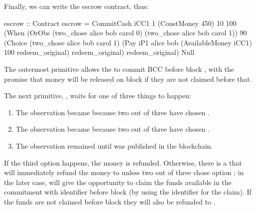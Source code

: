 \documentclass[runningheads]{llncs}
\begin{document}
Finally, we can write the escrow contract, thus:
\begin{haskellcode}
escrow :: Contract
escrow = CommitCash iCC1 1 (ConstMoney 450) 10 100
                    (When (OrObs (two_chose alice bob carol 0)
                                 (two_chose alice bob carol 1))
                          90
                          (Choice (two_chose alice bob carol 1)
                                  (Pay iP1 alice bob (AvailableMoney iCC1) 100
                                       redeem_original)
                                  redeem_original)
                          redeem_original)
                    Null
\end{haskellcode}

The outermost primitive  allows the  to commit 
 BCC before block , with the promise that money will be released on block 
 if they are not claimed before that.

The next primitive, , waits for one of three things to happen:
\begin{enumerate}
	\item The observation became  because two out of three have chosen . 
	\item The observation became  because two out of three have chosen .
	\item The observation remained  until  was published in the blockchain.
\end{enumerate}

If the third option happens, the money is refunded. Otherwise, there is a  that will 
immediately refund the money to  unless two out of three chose option 
; 
in the later case,  will give  the opportunity to claim the funds 
available in the commitment with identifier  before block  (by using the 
identifier  for the claim). If the funds are not claimed before block  they will 
also be refunded to .
\end{document}
